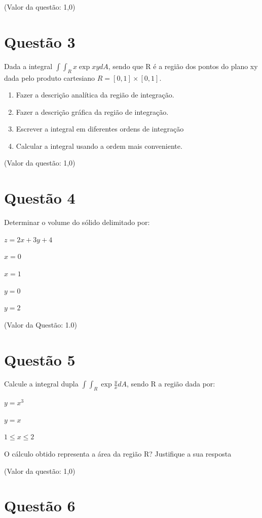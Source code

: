 \documentclass[10pt,a4paper]{article}
\begin{document}
	(Valor da questão: 1,0)
	
	\section*{Questão 3}
	
	Dada a integral $ \int \int_R x \exp{xy} dA $, sendo que R é a região dos pontos do plano xy dada pelo produto cartesiano $ R=[0, 1] \times [0, 1] $.
	
	\begin{enumerate}[a]
		\item Fazer a descrição analítica da região de integração.
		\item Fazer a descrição gráfica da região de integração.
		\item Escrever a integral em diferentes ordens de integração
		\item Calcular a integral usando a ordem mais conveniente.
	\end{enumerate}

	(Valor da questão: 1,0)
	
	\section*{Questão 4}
	
	Determinar o volume do sólido delimitado por:
	
	$ z = 2x+3y+4 $
	
	$ x = 0 $
	
	$ x = 1 $
	
	$ y = 0 $
	
	$ y = 2 $
	
	(Valor da Questão: 1.0)
	
	\section*{Questão 5}
	
	Calcule a integral dupla $ \int \int_R \exp{\frac{y}{x}} dA $, sendo R a região dada por:
	
	$ y = x^3 $
	
	$ y = x $
	
	$ 1 \le x \le 2 $
	
	O cálculo obtido representa a área da região R? Justifique a sua resposta
	
	(Valor da questão: 1,0)
	
	
	\section*{Questão 6}
	
\end{document}
